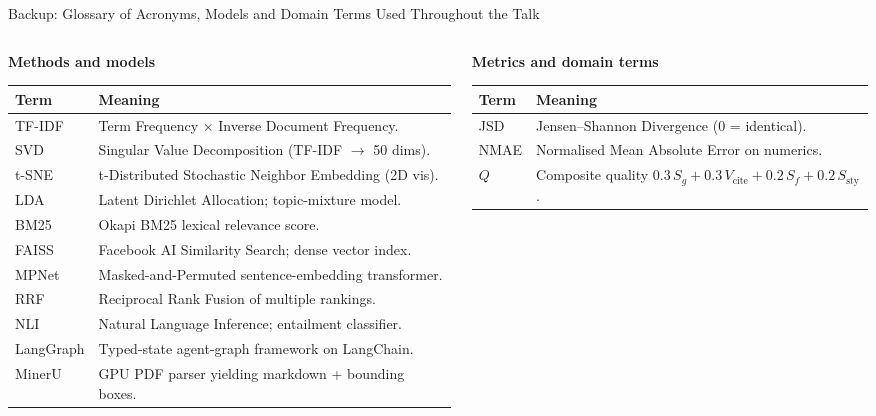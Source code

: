 \documentclass[aspectratio=169, 11pt]{beamer}
\begin{document}
\begin{frame}[shrink=55]{Backup: Glossary of Acronyms, Models and Domain Terms Used Throughout the Talk}
\color{ornlgrey!90}
\centering
\footnotesize
\setlength\tabcolsep{5pt}
\renewcommand{\arraystretch}{1.25}
\begin{columns}[T]
  \begin{column}{0.49\textwidth}\centering
    \textbf{Methods and models}\\[2pt]
    \begin{tabular}{@{}p{1.7cm}p{5.6cm}@{}}
    \toprule
    \textbf{Term} & \textbf{Meaning}\\
    \midrule
    TF-IDF    & Term Frequency $\times$ Inverse Document Frequency.\\
    SVD       & Singular Value Decomposition (TF-IDF $\to$ 50 dims).\\
    t-SNE     & t-Distributed Stochastic Neighbor Embedding (2D vis).\\
    LDA       & Latent Dirichlet Allocation; topic-mixture model.\\
    BM25      & Okapi BM25 lexical relevance score.\\
    FAISS     & Facebook AI Similarity Search; dense vector index.\\
    MPNet     & Masked-and-Permuted sentence-embedding transformer.\\
    RRF       & Reciprocal Rank Fusion of multiple rankings.\\
    NLI       & Natural Language Inference; entailment classifier.\\
    LangGraph & Typed-state agent-graph framework on LangChain.\\
    MinerU    & GPU PDF parser yielding markdown + bounding boxes.\\
    \bottomrule
    \end{tabular}
  \end{column}
  \begin{column}{0.51\textwidth}\centering
    \textbf{Metrics and domain terms}\\[2pt]
    \begin{tabular}{@{}p{2.0cm}p{5.4cm}@{}}
    \toprule
    \textbf{Term} & \textbf{Meaning}\\
    \midrule
    JSD       & Jensen--Shannon Divergence (0 = identical).\\
    NMAE      & Normalised Mean Absolute Error on numerics.\\
    $Q$       & Composite quality $0.3\,S_g{+}0.3\,V_{\text{cite}}{+}0.2\,S_f{+}0.2\,S_{\text{sty}}$.\\

\end{tabular}
\end{column}
\end{columns}
\end{frame}
\end{document}
